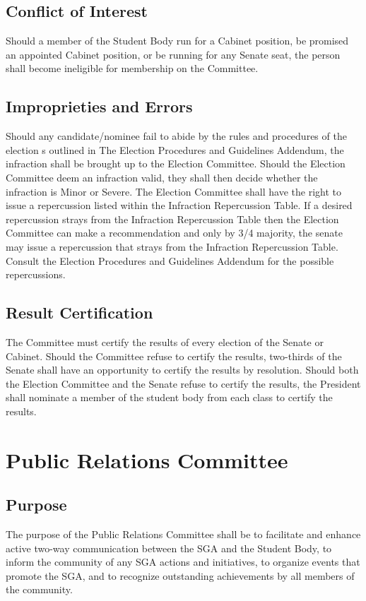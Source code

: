 \documentclass[12pt]{scrreprt}
\begin{document}
\subsection{Conflict of Interest}
Should a member of the Student Body run for a Cabinet position, be promised an 
appointed Cabinet position, or be running for any Senate seat, the person 
shall become ineligible for membership on the Committee.

\subsection{Improprieties and Errors}
Should any candidate/nominee fail to abide by the rules and procedures of the
election s outlined in The Election Procedures and Guidelines Addendum, the infraction shall be brought up to the Election Committee. Should the Election Committee deem an infraction valid, they shall then decide whether the infraction is Minor or Severe. The Election Committee shall have the right to issue a repercussion listed within the Infraction Repercussion Table. If a desired repercussion strays from the Infraction Repercussion Table then the Election Committee can make a recommendation and only by 3/4 majority, the senate may issue a repercussion that strays from the Infraction Repercussion Table. Consult the Election Procedures and Guidelines Addendum for the possible repercussions. 

\subsection{Result Certification}
The Committee must certify the results of every election of the Senate or 
Cabinet. Should the Committee refuse to certify the results, two-thirds of the 
Senate shall have an opportunity to certify the results by resolution. Should both the Election Committee and the Senate refuse to certify the results, the President shall nominate a member of the student body from each class to certify
the results. 

\section{Public Relations Committee}

\subsection{Purpose}
The purpose of the Public Relations Committee shall be to facilitate and enhance active two-way
communication between the SGA and the Student Body, to inform the community of 
any SGA actions and initiatives, to organize events that promote the SGA, and 
to recognize outstanding achievements by all members of the community. 
\end{document}

